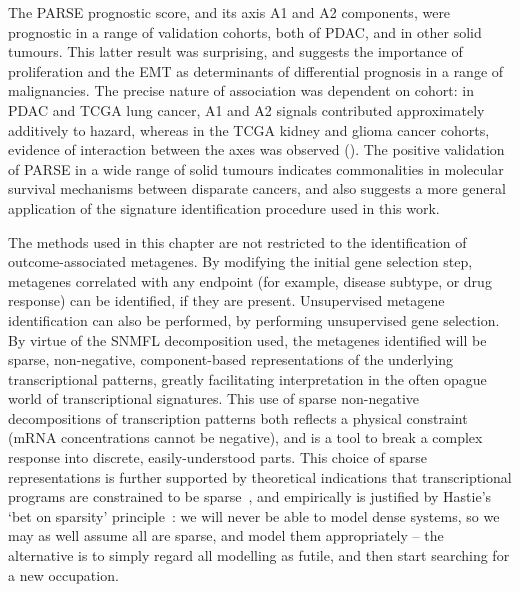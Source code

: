 \documentclass[dissertation.tex]{subfiles}
\begin{document}
The \gls{PARSE} prognostic score, and its axis A1 and A2 components, were prognostic in a range of validation cohorts, both of \gls{PDAC}, and in other solid tumours.  This latter result was surprising, and suggests the importance of proliferation and the \gls{EMT} as determinants of differential prognosis in a range of malignancies.  The precise nature of association was dependent on cohort: in \gls{PDAC} and \gls{TCGA} lung cancer, A1 and A2 signals contributed approximately additively to hazard, whereas in the \gls{TCGA} kidney and glioma cancer cohorts, evidence of interaction between the axes was observed ().  The positive validation of \gls{PARSE} in a wide range of solid tumours indicates commonalities in molecular survival mechanisms between disparate cancers, and also suggests a more general application of the signature identification procedure used in this work.    

The methods used in this chapter are not restricted to the identification of outcome-associated metagenes.  By modifying the initial gene selection step, metagenes correlated with any endpoint (for example, disease subtype, or drug response) can be identified, if they are present.  Unsupervised metagene identification can also be performed, by performing unsupervised gene selection.  By virtue of the \gls{SNMFL} decomposition used, the metagenes identified will be sparse, non-negative, component-based representations of the underlying transcriptional patterns, greatly facilitating interpretation in the often opague world of transcriptional signatures.  This use of sparse non-negative decompositions of transcription patterns both reflects a physical constraint (mRNA concentrations cannot be negative), and is a tool to break a complex response into discrete, easily-understood parts.  This choice of sparse representations is further supported by theoretical indications that transcriptional programs are constrained to be sparse~\cite{Leclerc2008}, and empirically is justified by Hastie's `bet on sparsity' principle~\cite{Hastie01statisticallearning}: we will never be able to model dense systems, so we may as well assume all are sparse, and model them appropriately -- the alternative is to simply regard all modelling as futile, and then start searching for a new occupation.
\end{document}
